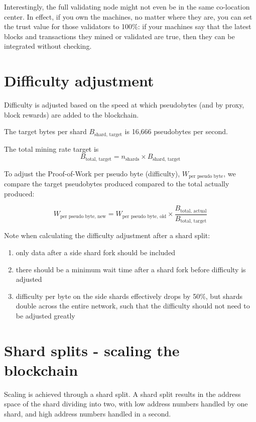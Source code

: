 \documentclass[a4paper,12pt]{article}
\begin{document}
Interestingly, the full validating node might not even be in the same co-location center. In effect, if you own the machines, no matter where they are, you can set the trust value for those validators to 100\%: if your machines say that the latest blocks and transactions they mined or validated are true, then they can be integrated without checking. 



\section{Difficulty adjustment}
Difficulty is adjusted based on the speed at which pseudobytes (and by proxy, block rewards) are added to the blockchain.

The target bytes per shard $B_{\text{shard, target}}$ is 16,666 pseudobytes per second. 

The total mining rate target is
\[B_{\text{total, target}} = n_{\text{shards}} \times B_{\text{shard, target}}\]

To adjust the Proof-of-Work per pseudo byte (difficulty), $W_{\text{per pseudo byte}}$, we compare the target pseudobytes produced compared to the total actually produced:

\[W_{\text{per pseudo byte, new}} = W_{\text{per pseudo byte, old}} \times \frac{B_{\text{total, actual}}}{B_{\text{total, target}}}\]


Note when calculating the difficulty adjustment after a shard split:

\begin{enumerate}
  \item only data after a side shard fork should be included
  \item there should be a minimum wait time after a shard fork before difficulty is adjusted
  \item difficulty per byte on the side shards effectively drops by 50\%, but shards double across the entire network, such that the difficulty should not need to be adjusted greatly
\end{enumerate}





\section{Shard splits - scaling the blockchain}
Scaling is achieved through a shard split. A shard split results in the address space of the shard dividing into two, with low address numbers handled by one shard, and high address numbers handled in a second. 
\end{document}
